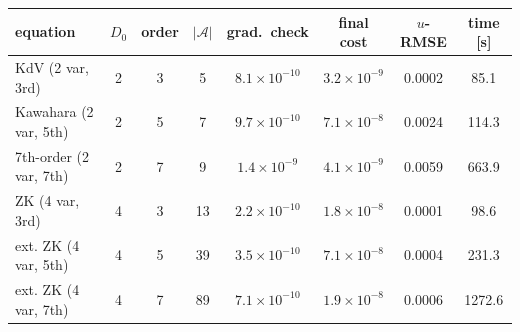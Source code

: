 \begin{tabular}{lccccccc}
\toprule
equation & $D_0$ & order & $|\mathcal{A}|$ & grad.\ check & final cost & $u$-RMSE & time [s] \\
\midrule
KdV (2 var, 3rd) & 2 & 3 & 5 & $8.1\times10^{-10}$ & $3.2\times10^{-9}$ & 0.0002 & 85.1 \\
Kawahara (2 var, 5th) & 2 & 5 & 7 & $9.7\times10^{-10}$ & $7.1\times10^{-8}$ & 0.0024 & 114.3 \\
7th-order (2 var, 7th) & 2 & 7 & 9 & $1.4\times10^{-9}$ & $4.1\times10^{-9}$ & 0.0059 & 663.9 \\
ZK (4 var, 3rd) & 4 & 3 & 13 & $2.2\times10^{-10}$ & $1.8\times10^{-8}$ & 0.0001 & 98.6 \\
ext. ZK (4 var, 5th) & 4 & 5 & 39 & $3.5\times10^{-10}$ & $7.1\times10^{-8}$ & 0.0004 & 231.3 \\
ext. ZK (4 var, 7th) & 4 & 7 & 89 & $7.1\times10^{-10}$ & $1.9\times10^{-8}$ & 0.0006 & 1272.6 \\
\bottomrule
\end{tabular}
